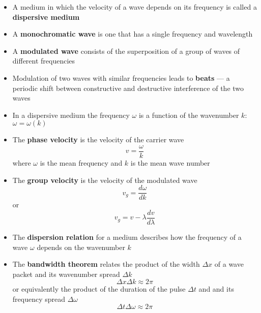 \documentclass{article}
\begin{document}
\begin{itemize}
  \item A medium in which the velocity of a wave depends on its frequency is called a \textbf{dispersive medium}

  \item A \textbf{monochromatic wave} is one that has a single frequency and wavelength

  \item A \textbf{modulated wave} consists of the superposition of a group of waves of different frequencies

  \item Modulation of two waves with similar frequencies leads to \textbf{beats} — a periodic shift between constructive and destructive interference of the two waves

  \item In a dispersive medium the frequency $\omega$ is a function of the wavenumber $k$: $\omega = \omega(k)$

  \item The \textbf{phase velocity} is the velocity of the carrier wave \[v = \frac{\omega}{k}\] where $\omega$ is the mean frequency and $k$ is the mean wave number

  \item The \textbf{group velocity} is the velocity of the modulated wave \[v_g = \frac{d \omega}{d k}\] or \[v_g = v - \lambda \frac{d v}{d \lambda}\]

  \item The \textbf{dispersion relation} for a medium describes how the frequency of a wave $\omega$ depends on the wavenumber $k$

  \item The \textbf{bandwidth theorem} relates the product of the width $\Delta x$ of a wave packet and its wavenumber spread $\Delta k$ \[\Delta x \Delta k \approx 2 \pi\] or equivalently the product of the duration of the pulse $\Delta t$ and and its frequency spread $\Delta \omega$ \[\Delta t \Delta \omega \approx 2 \pi\]
\end{itemize}
\end{document}
